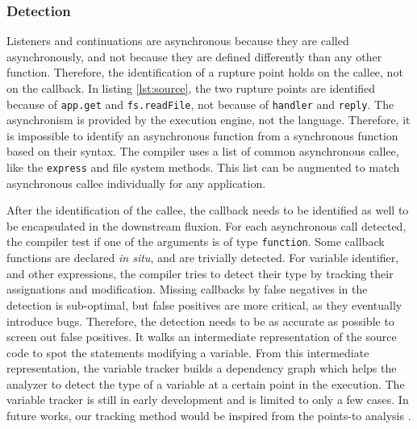\subsubsection{Detection}

Listeners and continuations are asynchronous because they are called asynchronously, and not because they are defined differently than any other function.
Therefore, the identification of a rupture point holds on the callee, not on the callback.
In listing \ref{lst:source}, the two rupture points are identified because of \texttt{app.get} and \texttt{fs.readFile}, not because of \texttt{handler} and \texttt{reply}.
The asynchronism is provided by the execution engine, not the language.
Therefore, it is impossible to identify an asynchronous function from a synchronous function based on their syntax.
The compiler uses a list of common asynchronous callee, like the \texttt{express} and file system methods.
This list can be augmented to match asynchronous callee individually for any application.


After the identification of the callee, the callback needs to be identified as well to be encapsulated in the downstream fluxion.
For each asynchronous call detected, the compiler test if one of the arguments is of type \texttt{function}.
Some callback functions are declared \textit{in situ}, and are trivially detected.
For variable identifier, and other expressions, the compiler tries to detect their type by tracking their assignations and modification.
Missing callbacks by false negatives in the detection is sub-optimal, but false positives are more critical, as they eventually introduce bugs.
Therefore, the detection needs to be as accurate as possible to screen out false positives.
It walks an intermediate representation of the source code to spot the statements modifying a variable.
From this intermediate representation, the variable tracker builds a dependency graph which helps the analyzer to detect the type of a variable at a certain point in the execution.
The variable tracker is still in early development and is limited to only a few cases.
In future works, our tracking method would be inspired from the points-to analysis \cite{Wei2014}.

